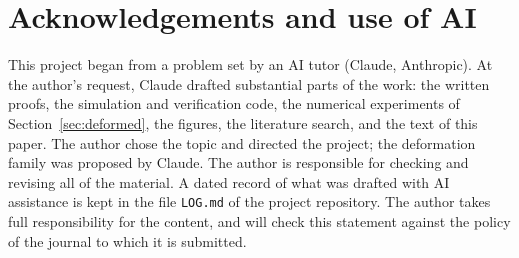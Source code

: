\documentclass[11pt]{amsart}
\theoremstyle{remark}
\begin{document}
\section*{Acknowledgements and use of AI}

This project began from a problem set by an AI tutor (Claude, Anthropic).
At the author's request, Claude drafted substantial parts of the work: the
written proofs, the simulation and verification code, the numerical
experiments of Section~\ref{sec:deformed}, the figures, the literature
search, and the text of this paper. The author chose the topic and directed the project; the deformation
family was proposed by Claude. The author is responsible for checking and
revising all of the material. A dated record of what was
drafted with AI assistance is kept in the file \texttt{LOG.md} of the
project repository. The author takes full responsibility for the content, and will check this
statement against the policy of the journal to which it is submitted.



\end{document}
